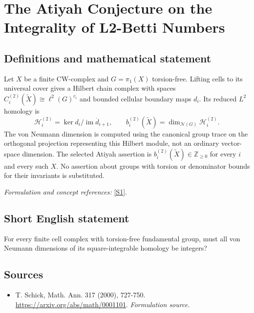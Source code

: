 \documentclass[11pt]{article}
\begin{document}
\section*{\texorpdfstring{The Atiyah Conjecture on the Integrality of L2-Betti Numbers}{The Atiyah Conjecture on the Integrality of L2-Betti Numbers}}\label{334}
\subsection{Definitions and mathematical statement}
Let $X$ be a finite CW-complex and $G=\pi_1(X)$ torsion-free. Lifting cells to its universal cover gives a Hilbert chain complex with spaces $C_i^{(2)}(\widetilde X)\cong\ell^2(G)^{c_i}$ and bounded cellular boundary maps $d_i$. Its reduced $L^2$ homology is
\[
 \mathcal H_i^{(2)}=\ker d_i\big/\overline{\operatorname{im}d_{i+1}},
 \qquad b_i^{(2)}(\widetilde X)=\dim_{\mathcal N(G)}\mathcal H_i^{(2)}.
\]
The von Neumann dimension is computed using the canonical group trace on the orthogonal projection representing this Hilbert module, not an ordinary vector-space dimension. The selected Atiyah assertion is $b_i^{(2)}(\widetilde X)\in{\mathbb{Z}}_{\ge0}$ for every $i$ and every such $X$. No assertion about groups with torsion or denominator bounds for their invariants is substituted.
\par\smallskip\textit{Formulation and concept references:} \href{https://arxiv.org/abs/math/0001101}{[S1]}.

\subsection{Short English statement}
For every finite cell complex with torsion-free fundamental group, must all von Neumann dimensions of its square-integrable homology be integers?
\subsection{Sources}
\begin{itemize}
\item[S1]T. Schick, Math. Ann. 317 (2000), 727-750.
\url{https://arxiv.org/abs/math/0001101}.
\textit{Formulation source.}
\end{itemize}
\end{document}
